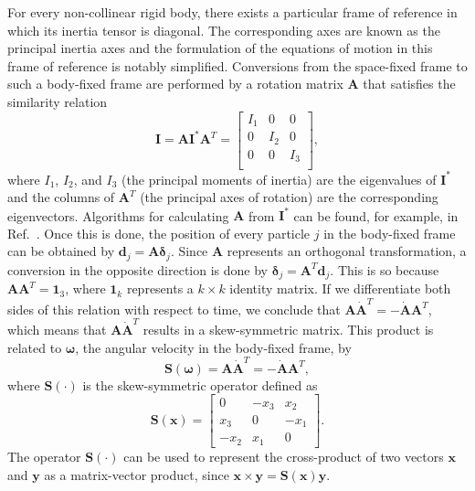 \documentclass[aip,jcp,reprint,amsmath,amssymb]{revtex4-1}
\newcommand{\mt}[1]{\boldsymbol{\mathbf{#1}}}           %
\newcommand{\vt}[1]{\boldsymbol{\mathbf{#1}}}           %
\newcommand{\tr}[1]{#1^T}                               %
\begin{document}
For every non-collinear rigid body, there exists a particular frame of reference in which its inertia tensor is diagonal. The corresponding axes are known as the principal inertia axes and the formulation of the equations of motion in this frame of reference is notably simplified. Conversions from the space-fixed frame to such a body-fixed frame are performed by a rotation matrix $\mt A$ that satisfies the similarity relation\citep{Goldstein2002}
\[
{\mt I} = {\mt A} {\mt I}^\ast \tr{\mt A} = \left[ \begin{array}{ccc}
I_1 &   0 &   0 \\
  0 & I_2 &   0 \\
  0 &   0 & I_3 \\
\end{array} \right],
\]
where $I_1$, $I_2$, and $I_3$ (the principal moments of inertia) are the eigenvalues of ${\mt I}^\ast$ and the columns of $\tr{\mt A}$ (the principal axes of rotation) are the corresponding eigenvectors. Algorithms for calculating $\mt A$ from $\mt I^\ast$ can be found, for example, in Ref.~. Once this is done, the position of every particle $j$ in the body-fixed frame can be obtained by ${\vt d}_j = {\mt A} {\vt \delta}_j$. Since $\mt A$ represents an orthogonal transformation, a conversion in the opposite direction is done by ${\vt \delta}_j = \tr{\mt A} {\vt d}_j$.\cite{Goldstein2002} This is so because $\mt A \tr{\mt A} = \mt 1_3$, where $\mt 1_k$ represents a $k \times k$ identity matrix. If we differentiate both sides of this relation with respect to time, we conclude that $\mt A \tr{\dot {\mt A}} = - \dot{\mt A} \tr{\mt A}$, which means that $\mt A \tr{\dot{\mt A}}$ results in a skew-symmetric matrix. This product is related to $\vt \omega$, the angular velocity in the body-fixed frame, by\cite{Haug1989}
\begin{equation}
\label{eq:relation_A_omega}
\mt S(\vt \omega) = \mt A \tr{\dot{\mt A}} = -\dot{\mt A} \tr{\mt A},
\end{equation}
where $\mt S(\cdot)$ is the skew-symmetric operator defined as
\begin{equation}
\label{eq:operator_S}
\mt S(\vt x) = \left[ \begin{array}{ccc}
 0   & -x_3 &  x_2 \\
 x_3 &  0   & -x_1 \\
-x_2 &  x_1 &  0
\end{array}\right].
\end{equation}
The operator  $\mt S(\cdot)$ can be used to represent the cross-product of two vectors $\vt x$ and $\vt y$ as a matrix-vector product, since $\vt x \times \vt y = \mt S(\vt x)\vt y$.
\end{document}
